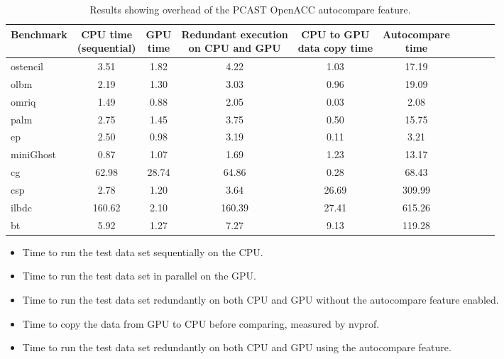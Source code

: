 \begin{table}
\begin{center}
\begin{tabular}{|l|c|c|c|c|c|c|c|c|c|}
\hline

Benchmark & \parbox[c]{1.9 cm}{\centering CPU time \\(sequential)} &  \parbox[c]{1.1 cm}{\centering GPU \\ time} & \parbox[c]{3.5 cm}{\centering Redundant execution \\ on CPU and GPU} & \parbox[c]{2.75 cm}{\centering CPU to GPU \\  data copy time} &  \parbox[c]{2 cm}{\centering Autocompare \\   time} \\


\hline
\hline

ostencil  & 3.51 & 1.82 & 4.22 & 1.03 & 17.19\\
\hline
olbm      & 2.19 & 1.30 & 3.03 & 0.96 & 19.09 \\
\hline
omriq     & 1.49 & 0.88 & 2.05 & 0.03 & 2.08\\
\hline
palm      & 2.75 & 1.45 & 3.75 & 0.50 & 15.75\\
\hline
ep        & 2.50 & 0.98 & 3.19 & 0.11 & 3.21\\
\hline
miniGhost & 0.87 & 1.07 & 1.69 & 1.23 & 13.17\\
\hline
cg        & 62.98 & 28.74 & 64.86 & 0.28 & 68.43\\
\hline
csp       & 2.78 & 1.20	& 3.64 & 26.69 & 309.99\\
\hline
ilbdc     & 160.62 & 2.10 & 160.39 & 27.41 & 615.26\\
\hline
bt        & 5.92 & 1.27 & 7.27 & 9.13 & 119.28\\        
\hline
\end{tabular}
\end{center}
\caption{Results showing overhead of the PCAST OpenACC autocompare feature.}
\label{res1}
\end{table}

\begin{itemize}
\item Time to run the test data set sequentially on the CPU.
\item Time to run the test data set in parallel on the GPU.
\item Time to run the test data set redundantly on both CPU and GPU without the autocompare feature enabled.
\item Time to copy the data from GPU to CPU before comparing, measured by nvprof.
\item Time to run the test data set redundantly on both CPU and GPU using the autocompare feature.
\end{itemize}



